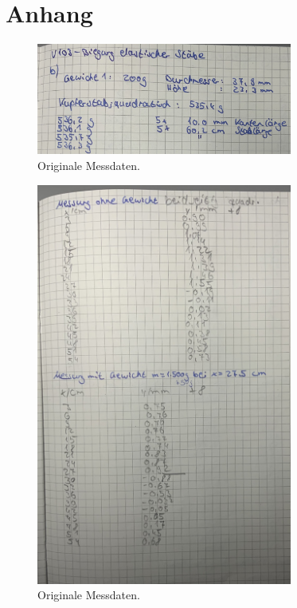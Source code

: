 \section{Anhang}
\label{sec:anhang}

\begin{figure}[H]
  \centering
  \includegraphics[width=0.75\textwidth]{Dateien/Bild1.jpeg}
  \caption{Originale Messdaten.}
  \label{fig:daten1}
\end{figure}

\begin{figure}[H]
    \centering
    \includegraphics[width=0.75\textwidth]{Dateien/Bild2.jpeg}
    \caption{Originale Messdaten.}
    \label{fig:daten2}
\end{figure}

